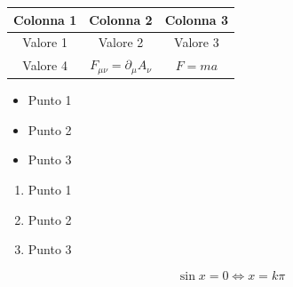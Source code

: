 \documentclass[10pt]{article}
\begin{document}
\begin{table}[h!]
    \centering
    \begin{tabular}{c|c|c}
        Colonna 1 & Colonna 2 & Colonna 3 \\ \hline
        Valore 1  & Valore 2  & Valore 3  \\ \hline
        Valore 4  & $F_{\mu\nu}=\partial_{\mu}A_{\nu}$  & $F=ma$  \\ 
    \end{tabular}
\end{table}

\begin{itemize}
    \item Punto 1
    \item Punto 2
    \item Punto 3
\end{itemize}

\begin{enumerate}
    \item Punto 1
    \item Punto 2
    \item Punto 3 
\end{enumerate}

\begin{equation}
    \sin x=0 \iff x=k\pi
    \label{ciao}
\end{equation}
\end{document}
